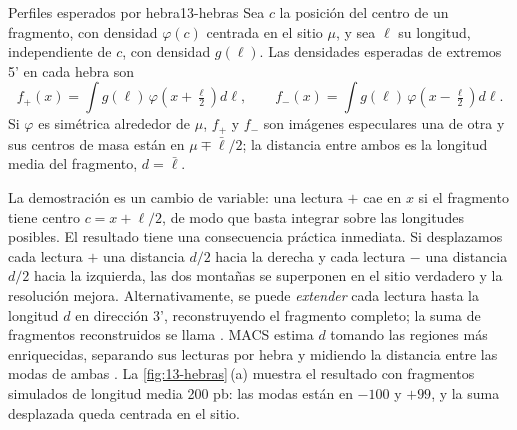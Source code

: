 \begin{teorema}{Perfiles esperados por hebra}{13-hebras}
Sea $c$ la posición del centro de un fragmento, con densidad $\varphi(c)$ centrada en el sitio $\mu$, y sea $\ell$ su longitud, independiente de $c$, con densidad $g(\ell)$. Las densidades esperadas de extremos 5' en cada hebra son
\begin{equation}\label{eq:13-hebras}
f_{+}(x) = \int g(\ell)\,\varphi\!\left(x+\tfrac{\ell}{2}\right)d\ell,\qquad
f_{-}(x) = \int g(\ell)\,\varphi\!\left(x-\tfrac{\ell}{2}\right)d\ell .
\end{equation}
Si $\varphi$ es simétrica alrededor de $\mu$, $f_+$ y $f_-$ son imágenes especulares una de otra y sus centros de masa están en $\mu\mp\bar\ell/2$; la distancia entre ambos es la longitud media del fragmento, $d=\bar\ell$.
\end{teorema}

\begin{simbolos}
\end{simbolos}

La demostración es un cambio de variable: una lectura $+$ cae en $x$ si el fragmento tiene centro $c=x+\ell/2$, de modo que basta integrar sobre las longitudes posibles. El resultado tiene una consecuencia práctica inmediata. Si desplazamos cada lectura $+$ una distancia $d/2$ hacia la derecha y cada lectura $-$ una distancia $d/2$ hacia la izquierda, las dos montañas se superponen en el sitio verdadero y la resolución mejora. Alternativamente, se puede \emph{extender} cada lectura hasta la longitud $d$ en dirección 3', reconstruyendo el fragmento completo; la suma de fragmentos reconstruidos se llama . MACS estima $d$ tomando las regiones más enriquecidas, separando sus lecturas por hebra y midiendo la distancia entre las modas de ambas \parencite{c13-zhang2008}. La \cref{fig:13-hebras}\,(a) muestra el resultado con fragmentos simulados de longitud media 200 pb: las modas están en $-100$ y $+99$, y la suma desplazada queda centrada en el sitio.

